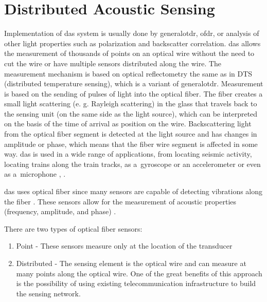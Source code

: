 \section{Distributed Acoustic Sensing}

Implementation of \ac{das} system is usually done by \ac{generalotdr}, \ac{ofdr}, or analysis of other light properties such as polarization and backscatter correlation. \ac{das} allows the measurement of thousands of points on an optical wire without the need to cut the wire or have multiple sensors distributed along the wire. The measurement mechanism is based on optical reflectometry the same as in DTS (distributed temperature sensing), which is a variant of \ac{generalotdr}. Measurement is based on the sending of pulses of light into the optical fiber. The fiber creates a small light scattering (e. g. Rayleigh scattering) in the glass that travels back to the sensing unit (on the same side as the light source), which can be interpreted on the basis of the time of arrival as position on the wire. Backscattering light from the optical fiber segment is detected at the light source and has changes in amplitude or phase, which means that the fiber wire segment is affected in some way. \ac{das} is used in a wide range of applications, from locating seismic activity, locating trains along the train tracks, as a~gyroscope or an accelerometer or even as a~microphone \cite{WangYu2017RDVM}, \cite{kislov_das_newparadigm}.

\ac{das} uses optical fiber since many sensors are capable of detecting vibrations along the fiber \cite{gabai}. These sensors allow for the measurement of acoustic properties (frequency, amplitude, and phase) \cite{WangYu2017RDVM}. 

There are two types of optical fiber sensors:
\begin{enumerate}
    \item Point - These sensors measure only at the location of the transducer
    \item Distributed - The sensing element is the optical wire and can measure at many points along the optical wire. One of the great benefits of this approach is the possibility of using existing telecommunication infrastructure to build the sensing network.
\end{enumerate}


